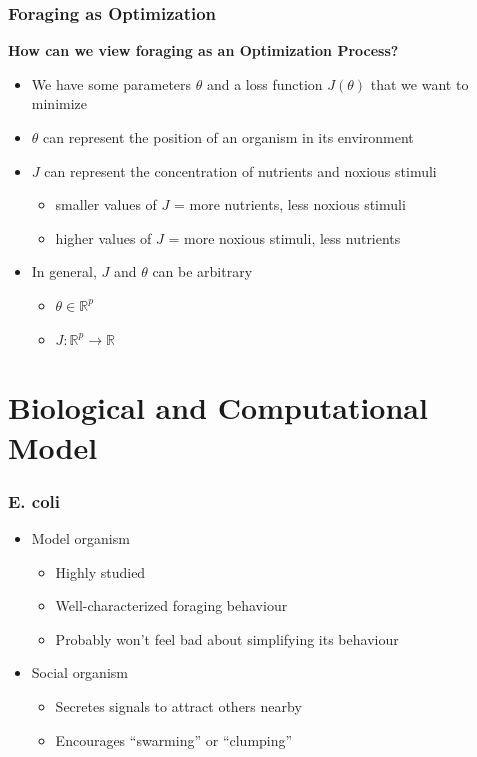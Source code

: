 \documentclass{beamer}
\begin{document}
\begin{frame}
\frametitle{Foraging as Optimization}
\textbf{How can we view foraging as an Optimization Process?}
\begin{itemize}
  \item<1-> We have some parameters $\theta$ and a loss function $J(\theta)$ that we want to minimize
  \item<2-> $\theta$ can represent the position of an organism in its environment
  \item<3-> $J$ can represent the concentration of nutrients and noxious stimuli
  \begin{itemize}
    \item smaller values of $J$ = more nutrients, less noxious stimuli
    \item higher values of $J$ = more noxious stimuli, less nutrients
  \end{itemize}
  \item<4-> In general, $J$ and $\theta$ can be arbitrary
  \begin{itemize}
    \item $\theta \in \mathbb{R}^p$
    \item $J: \mathbb{R}^p \to \mathbb{R}$
  \end{itemize}
\end{itemize}
\end{frame}

\section{Biological and Computational Model}
\begin{frame}
\frametitle{E. coli}
\begin{itemize}
  \item<1-> Model organism
  \begin{itemize}
    \item<2-> Highly studied
    \item<3-> Well-characterized foraging behaviour
    \item<4-> Probably won't feel bad about simplifying its behaviour
  \end{itemize}
  \item<5-> Social organism
  \begin{itemize}
    \item<6-> Secretes signals to attract others nearby
    \item<7-> Encourages ``swarming'' or ``clumping''
  \end{itemize}
\end{itemize}
\end{frame}
\end{document}
